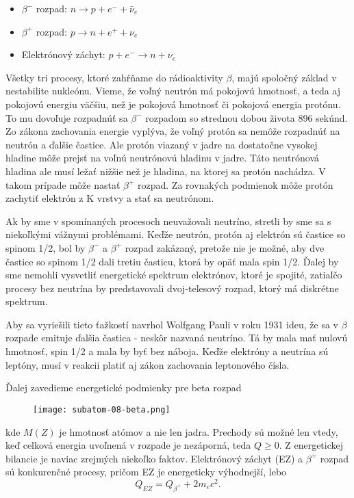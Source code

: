\documentclass[../../main.tex]{subfiles}
\begin{document}
\begin{itemize}
\item $\beta^{-}$ rozpad: $ n \rightarrow p + e^{-} + \bar{\nu}_e$
\item $\beta^{+}$ rozpad: $ p \rightarrow n + e^{+} + \nu_e$
\item Elektrónový záchyt: $ p + e^{-} \rightarrow n + \nu_{e} $ 
\end{itemize}

Všetky tri procesy, ktoré zahŕňame do rádioaktivity $\beta$, majú spoločný základ v nestabilite nukleónu. Vieme, že voľný neutrón má pokojovú hmotnosť, a teda aj pokojovú energiu väčšiu, než je pokojová hmotnosť či pokojová energia protónu. To mu dovoľuje rozpadnúť sa $\beta^-$ rozpadom so strednou dobou života 896 sekúnd. Zo zákona zachovania energie vyplýva, že voľný protón sa nemôže rozpadnúť na neutrón a ďalšie častice. Ale protón viazaný v jadre na dostatočne vysokej hladine môže prejsť na voľnú neutrónovú hladinu v jadre. Táto neutrónová hladina ale musí ležať nižšie než je hladina, na ktorej sa protón nachádza. V takom prípade môže nastať $\beta^+$ rozpad. Za rovnakých podmienok môže protón zachytiť elektrón z K vrstvy a stať sa neutrónom.

Ak by sme v spomínaných procesoch neuvažovali neutríno, stretli by sme sa s niekoľkými vážnymi problémami. Keďže neutrón, protón aj elektrón sú častice so spinom 1/2, bol by $\beta^-$ a $\beta^+$ rozpad zakázaný, pretože nie je možné, aby dve častice so spinom 1/2 dali tretiu časticu, ktorá by opäť mala spin 1/2. Ďalej by sme nemohli vysvetliť energetické spektrum elektrónov, ktoré je spojité, zatiaľčo procesy bez neutrína by predstavovali dvoj-telesový rozpad, ktorý má diskrétne spektrum.

Aby sa vyriešili tieto ťažkostí navrhol Wolfgang Pauli v roku 1931 ideu, že sa v $\beta$ rozpade emituje ďalšia častica - neskôr nazvaná neutríno. Tá by mala mať nulovú hmotnosť, spin 1/2 a mala by byť bez náboja. Keďže elektróny a neutrína sú leptóny, musí v reakcii platiť aj zákon zachovania leptonového čísla.

Ďalej zavedieme energetické podmienky pre beta rozpad
\begin{figure}[!h]
\texttt{[image: subatom-08-beta.png]}
\centering
\end{figure}

kde $M(Z)$ je hmotnosť atómov a nie len jadra. Prechody sú možné len vtedy, keď celková energia uvoľnená v rozpade je nezáporná, teda $Q\geq0$. Z energetickej bilancie je naviac zrejmých niekoľko faktov. Elektrónový záchyt (EZ) a $\beta^+$ rozpad sú konkurenčné procesy, pričom EZ je energeticky výhodnejší, lebo
$$ Q_{EZ} = Q_{\beta^+}+2m_{e}c^2.$$
\end{document}
